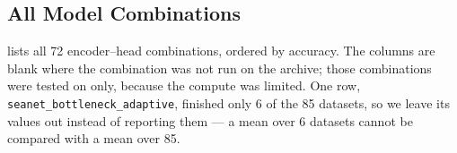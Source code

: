 \subsection{All Model Combinations}
\label{app:leaderboard}

 lists all 72 encoder--head combinations, ordered by \webtraffic{}
accuracy. The \ucr{} columns are blank where the combination was not run on the archive; those
combinations were tested on \webtraffic{} only, because the compute was limited. One row,
\texttt{seanet\_bottleneck\_adaptive}, finished only 6 of the 85 \ucr{} datasets, so we leave its
\ucr{} values out instead of reporting them --- a mean over 6 datasets cannot be compared with a mean
over 85.


